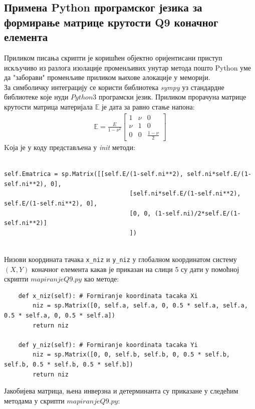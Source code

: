 \documentclass[11pt, a4paper]{article}
\begin{document}
\subsection{Примена Python програмског језика за формирање матрице крутости Q9 коначног елемента}
Приликом писања скрипти је коришћен објектно оријентисани приступ искључиво из разлога изолације променљивих унутар метода пошто Python уме да "заборави" променљиве приликом њихове алокације у меморији.\\
За симболичку интеграцију се користи библиотека \textit{sympy} \cite{sympy} уз стандардне библиотеке које нуди $Python3$ програмски језик.
Приликом прорачуна матрице крутости матрица материјала $\mathbb{E}$ је дата за равно стање напона:
\begin{eqnarray}
\mathbb{E} = \frac{E}{1 - \nu^2}
\begin{bmatrix}
 1 & \nu & 0\\
 \nu & 1 & 0\\
 0 & 0 & \frac{1 - \nu}{2}
\end{bmatrix}
\end{eqnarray}
 Kоја је у коду представљена у \textit{init} методи:
\begin{lstlisting}

self.Ematrica = sp.Matrix([[self.E/(1-self.ni**2), self.ni*self.E/(1-self.ni**2), 0],
                                   [self.ni*self.E/(1-self.ni**2), self.E/(1-self.ni**2), 0],
                                   [0, 0, (1-self.ni)/2*self.E/(1-self.ni**2)]
                                   ])
                                   
\end{lstlisting}

Низови координата тачака \texttt{x\_niz} и \texttt{y\_niz} у глобалном координатом систему $(X,Y)$ коначног елемента какав је приказан на слици 5 су дати у помоћној скрипти $mapiranjeQ9.py$ као методе:

\begin{lstlisting}
    def x_niz(self): # Formiranje koordinata tacaka Xi
        niz = sp.Matrix([0, self.a, self.a, 0, 0.5 * self.a, self.a, 0.5 * self.a, 0, 0.5 * self.a])
        return niz

    def y_niz(self): # Formiranje koordinata tacaka Yi
        niz = sp.Matrix([0, 0, self.b, self.b, 0, 0.5 * self.b, self.b, 0.5 * self.b, 0.5 * self.b])
        return niz
\end{lstlisting}

Јакобијева матрица, њена инверзна и детерминанта су приказане у следећим методама у скрипти $mapiranjeQ9.py$:
\end{document}

